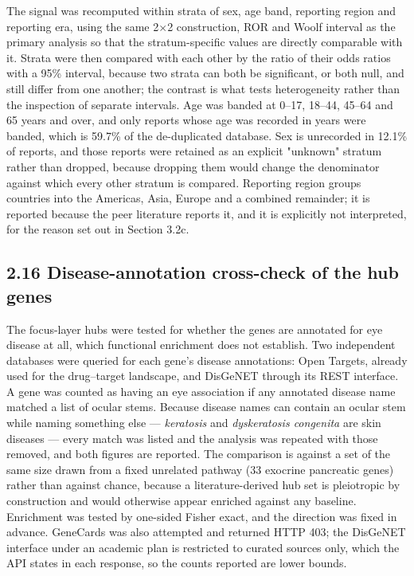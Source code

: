 \documentclass[utf8]{FrontiersinVancouver}
\begin{document}
The signal was recomputed within strata of sex, age band, reporting region and reporting era, using the same 2$\times$2 construction, ROR and Woolf interval as the primary analysis so that the stratum-specific values are directly comparable with it. Strata were then compared with each other by the ratio of their odds ratios with a 95\% interval, because two strata can both be significant, or both null, and still differ from one another; the contrast is what tests heterogeneity rather than the inspection of separate intervals. Age was banded at 0--17, 18--44, 45--64 and 65 years and over, and only reports whose age was recorded in years were banded, which is 59.7\% of the de-duplicated database. Sex is unrecorded in 12.1\% of reports, and those reports were retained as an explicit "unknown" stratum rather than dropped, because dropping them would change the denominator against which every other stratum is compared. Reporting region groups countries into the Americas, Asia, Europe and a combined remainder; it is reported because the peer literature reports it, and it is explicitly not interpreted, for the reason set out in Section 3.2c.

\subsection{2.16 Disease-annotation cross-check of the hub genes}

The focus-layer hubs were tested for whether the genes are annotated for eye disease at all, which functional enrichment does not establish. Two independent databases were queried for each gene's disease annotations: Open Targets, already used for the drug--target landscape, and DisGeNET through its REST interface. A gene was counted as having an eye association if any annotated disease name matched a list of ocular stems. Because disease names can contain an ocular stem while naming something else --- \textit{keratosis} and \textit{dyskeratosis congenita} are skin diseases --- every match was listed and the analysis was repeated with those removed, and both figures are reported. The comparison is against a set of the same size drawn from a fixed unrelated pathway (33 exocrine pancreatic genes) rather than against chance, because a literature-derived hub set is pleiotropic by construction and would otherwise appear enriched against any baseline. Enrichment was tested by one-sided Fisher exact, and the direction was fixed in advance. GeneCards was also attempted and returned HTTP 403; the DisGeNET interface under an academic plan is restricted to curated sources only, which the API states in each response, so the counts reported are lower bounds.
\end{document}
